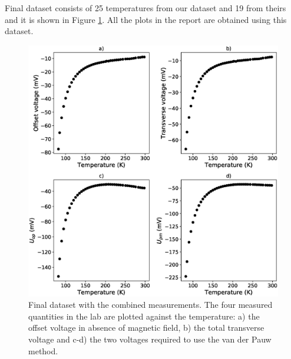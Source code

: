 \documentclass[11pt,a4paper]{article}
\begin{document}
\begin{appendices}
Final dataset consists of 25 temperatures from our dataset and 19 from theirs and it is shown in Figure \ref{fig:final_dataset}. All the plots in the report are obtained using this dataset.

\begin{figure}[H]
\centering
\includegraphics[width=\textwidth]{final_dataset.eps}
\caption{Final dataset with the combined measurements. The four measured quantities in the lab are plotted against the temperature: a) the offset voltage in absence of magnetic field, b) the total transverse voltage and c-d) the two voltages required to use the van der Pauw method.}
\label{fig:final_dataset}
\end{figure}

\end{appendices}
\end{document}
